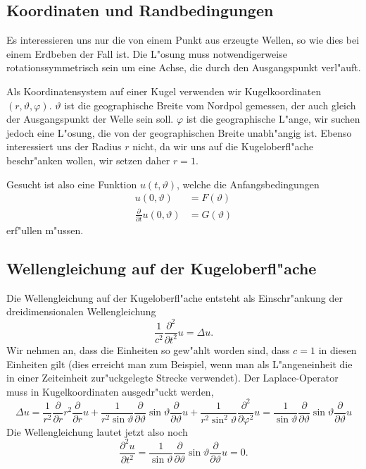 \subsection{Koordinaten und Randbedingungen}
Es interessieren uns nur die von einem Punkt aus erzeugte Wellen,
so wie dies bei einem Erdbeben der Fall ist. Die L"osung muss
notwendigerweise rotationssymmetrisch sein um eine Achse, die
durch den Ausgangspunkt verl"auft. 

Als Koordinatensystem auf einer Kugel verwenden wir Kugelkoordinaten
$(r,\vartheta,\varphi)$. $\vartheta$ ist die geographische Breite
vom Nordpol gemessen, der auch gleich der Ausgangspunkt der
Welle sein soll. $\varphi$ ist die geographische L"ange, wir
suchen jedoch eine L"osung, die von der geographischen Breite
unabh"angig ist. Ebenso interessiert uns der Radius $r$ nicht,
da wir uns auf die Kugeloberfl"ache beschr"anken wollen, wir
setzen daher $r=1$.

Gesucht ist also eine Funktion $u(t,\vartheta)$, welche die
Anfangsbedingungen
\begin{align*}
u(0,\vartheta)&=F(\vartheta)\\
\frac{\partial}{\partial t}u(0,\vartheta)&=G(\vartheta)
\end{align*}
erf"ullen m"ussen.

\subsection{Wellengleichung auf der Kugeloberfl"ache}
Die Wellengleichung auf der Kugeloberfl"ache entsteht als 
Einschr"ankung der dreidimensionalen Wellengleichung
$$
\frac1{c^2} \frac{\partial^2}{\partial t^2}u =\Delta u.
$$
Wir nehmen an, dass die Einheiten so gew"ahlt worden sind,
dass $c=1$ in diesen Einheiten gilt (dies erreicht man zum
Beispiel, wenn man als L"angeneinheit die in einer Zeiteinheit
zur"uckgelegte Strecke verwendet).
Der Laplace-Operator muss in Kugelkoordinaten ausgedr"uckt werden,
$$
\Delta u
=
\frac1{r^2} \frac{\partial}{\partial r}r^2\frac{\partial}{\partial r}u
+
\frac1{r^2\sin\vartheta}
\frac{\partial}{\partial\vartheta}
\sin\vartheta
\frac{\partial}{\partial\vartheta}
u
+
\frac1{r^2\sin^2\vartheta}\frac{\partial^2}{\partial\varphi^2}u
=
\frac1{\sin\vartheta}
\frac{\partial}{\partial\vartheta}
\sin\vartheta
\frac{\partial}{\partial\vartheta}
u
$$
Die Wellengleichung lautet jetzt also noch
\begin{equation}
\frac{\partial^2u}{\partial t^2}=
\frac1{\sin\vartheta}
\frac{\partial}{\partial\vartheta}
\sin\vartheta
\frac{\partial}{\partial\vartheta}
u=0.
\label{tsunami-gleichung}
\end{equation}

